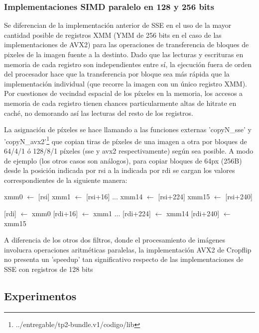 \subsubsection{Implementaciones SIMD paralelo en 128 y 256 bits}
Se diferencian de la implementación anterior de SSE en el uso de la mayor cantidad posible de registros XMM (YMM de 256 bits en el caso de las implementaciones de AVX2) para las operaciones de transferencia de bloques de pixeles de la imagen fuente a la destinto. 
Dado que las lecturas y escrituras en memoria de cada registro son independientes entre sí, la ejecución fuera de orden del procesador hace que la transferencia por bloque sea más rápida que la implementación individual (que recorre la imagen con un único registro XMM). Por cuestiones de vecindad espacial de los píxeles en la memoria, los accesos a memoria de cada registro tienen chances particularmente altas de hitrate en caché, no demorando así las lecturas del resto de los registros.


La asignación de píxeles se hace llamando a las funciones externas 'copyN_sse' y 'copyN_avx2'\footnote{../entregable/tp2-bundle.v1/codigo/lib} que copian tiras de píxeles de una imagen a otra por bloques de 64/4/1 ó 128/8/1 píxeles (sse y avx2 respectivamente) según sea posible. A modo de ejemplo (los otros casos son análogos), para copiar bloques de 64px (256B) desde la posición indicada por rsi a la indicada por rdi se cargan los valores correspondientes de la siguiente manera:


xmm0 $\leftarrow$ [rsi]
xmm1 $\leftarrow$ [rsi+16]
...
xmm14 $\leftarrow$ [rsi+224]
xmm15 $\leftarrow$ [rsi+240]

[rdi] $\leftarrow$ xmm0
[rdi+16] $\leftarrow$ xmm1
...
[rdi+224] $\leftarrow$ xmm14
[rdi+240] $\leftarrow$ xmm15   


A diferencia de los otros dos filtros, donde el procesamiento de imágenes involucra operaciones aritméticas paralelas, la implementación AVX2 de Cropflip no presenta un 'speedup' tan significativo respecto de las implementaciones de SSE con registros de 128 bits




\subsection{Experimentos}

